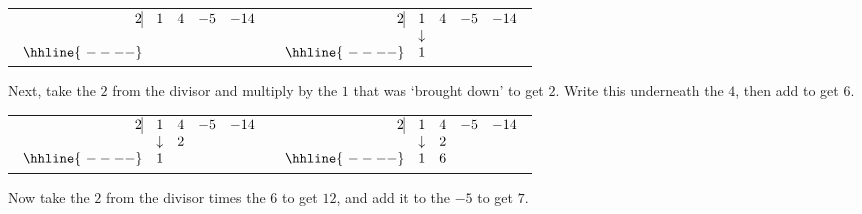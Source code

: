 \documentclass{ximera}
\begin{document}
\begin{center}
    \begin{tabular}{cc}
        $ \begin{array}{rrrrr}
            2   \vline& 1 & 4 & -5  & -14 \\
            &  &    &    &  \\ \hhline{~----} 
            &   &     &   &    \\  
        \end{array}$  \hspace{1in}
        &
        $ \begin{array}{rrrrr}
            2   \vline& 1 & 4 & -5  & -14 \\
            & \downarrow &    &    &  \\ \hhline{~----} 
            & 1  &     &   &    \\  
        \end{array}$ \\
    \end{tabular}
\end{center}

Next, take the $2$ from the divisor and multiply by the $1$ that was `brought down' to get $2$.  Write this underneath the $4$, then add to get $6$.

\begin{center}
    \begin{tabular}{cc}
        $ \begin{array}{rrrrr}
            2   \vline& 1 & 4 & -5  & -14 \\
            & \downarrow  &  2  &    &  \\ \hhline{~----} 
            & 1  &     &   &    \\  
        \end{array}$ \hspace{1in}
        &
        $ \begin{array}{rrrrr}
            2   \vline& 1 & 4 & -5  & -14 \\
            & \downarrow &  2  &    &  \\ \hhline{~----} 
            & 1  &   6  &   &    \\  
        \end{array}$ \\
    \end{tabular}
\end{center}

Now take the $2$ from the divisor times the $6$ to get $12$, and add it to the $-5$ to get $7$.
\end{document}
